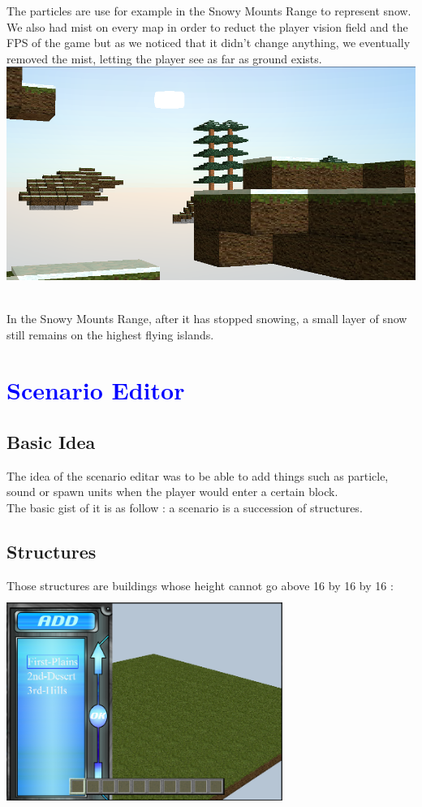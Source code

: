 \documentclass[article]{report}         %
\begin{document}
The particles are use for example in the Snowy Mounts Range to represent snow. We also had mist on every map in order to reduct the player vision field and the FPS of the game but as we noticed that it didn't change anything, we eventually removed the mist, letting the player see as far as ground exists.\\


\includegraphics[width=16cm]{images/snowy_mounts_range.png}

~\\
 
In the Snowy Mounts Range, after it has stopped snowing, a small layer of snow still remains on the highest flying islands.\\
    \chapter{\textcolor{blue}{Scenario Editor}}
      \section{Basic Idea}
				The idea  of the scenario editar was to be able to add things such as particle, sound or spawn units when the player would enter a certain block.\\
				The basic gist of it is as follow : a scenario is a succession of structures.
      \section{Structures}
				Those structures are buildings whose height cannot go above 16 by 16 by 16 :\\
				
				\includegraphics[width=9cm, height=7cm]{images/Scenario.png}
				
\end{document}
